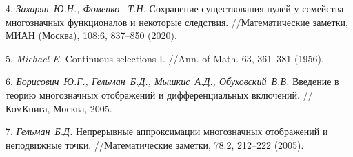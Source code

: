 \documentclass{vzmsthesis}
\begin{document}
4.
{\it Захарян~Ю.Н., Фоменко ~Т.Н.}  Сохранение существования нулей у семейства многозначных функционалов и некоторые следствия. //Математические заметки, МИАН (Мос\-ква), 108:6, 837--850 (2020).

5.
{\it Michael E. } Continuous selections I. //Ann. of Math. 63, 361--381 (1956).

6.
{\it Борисович~Ю.Г., Гельман~Б.Д., Мышкис~А.Д., Обухов\-ский~В.В.}
Введение в теорию многозначных отображений и дифференциальных включений. //КомКнига, Москва, 2005.

7.
{\it Гельман~Б.Д.} Непрерывные аппроксимации многозначных отображений и неподвижные точки. //Математические заметки,  78:2, 212--222 (2005).
\end{document}
